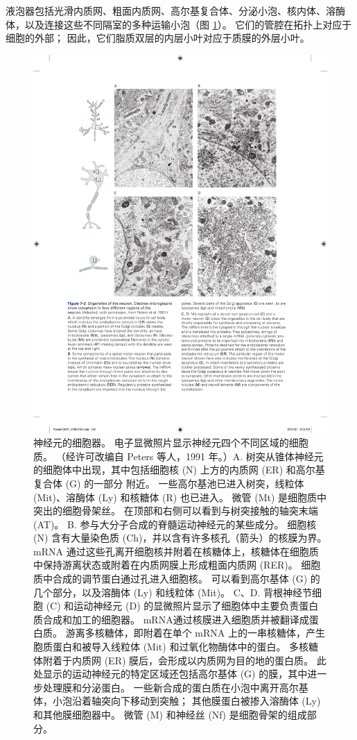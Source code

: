 液泡器包括光滑内质网、粗面内质网、高尔基复合体、分泌小泡、核内体、溶酶体，以及连接这些不同隔室的多种运输小泡（图 \ref{fig:7_3}）。 
它们的管腔在拓扑上对应于细胞的外部； 
因此，它们脂质双层的内层小叶对应于质膜的外层小叶。

\begin{figure}[htbp]
	\centering
	\includegraphics[width=1.0\linewidth]{chap07/fig_7_3}
	\caption{神经元的细胞器。 电子显微照片显示神经元四个不同区域的细胞质。 （经许可改编自 Peters 等人，1991 年。）A. 树突从锥体神经元的细胞体中出现，其中包括细胞核 (N) 上方的内质网 (ER) 和高尔基复合体 (G) 的一部分 附近。 一些高尔基池已进入树突，线粒体 (Mit)、溶酶体 (Ly) 和核糖体 (R) 也已进入。 微管 (Mt) 是细胞质中突出的细胞骨架丝。 在顶部和右侧可以看到与树突接触的轴突末端 (AT)。 B. 参与大分子合成的脊髓运动神经元的某些成分。 细胞核 (N) 含有大量染色质 (Ch)，并以含有许多核孔（箭头）的核膜为界。 mRNA 通过这些孔离开细胞核并附着在核糖体上，核糖体在细胞质中保持游离状态或附着在内质网膜上形成粗面内质网 (RER)。 细胞质中合成的调节蛋白通过孔进入细胞核。 可以看到高尔基体 (G) 的几个部分，以及溶酶体 (Ly) 和线粒体 (Mit)。 C、D. 背根神经节细胞 (C) 和运动神经元 (D) 的显微照片显示了细胞体中主要负责蛋白质合成和加工的细胞器。 mRNA通过核膜进入细胞质并被翻译成蛋白质。 游离多核糖体，即附着在单个 mRNA 上的一串核糖体，产生胞质蛋白和被导入线粒体 (Mit) 和过氧化物酶体中的蛋白。 多核糖体附着于内质网 (ER) 膜后，会形成以内质网为目的地的蛋白质。 此处显示的运动神经元的特定区域还包括高尔基体 (G) 的膜，其中进一步处理膜和分泌蛋白。 一些新合成的蛋白质在小泡中离开高尔基体，小泡沿着轴突向下移动到突触； 其他膜蛋白被掺入溶酶体 (Ly) 和其他膜细胞器中。 微管 (M) 和神经丝 (Nf) 是细胞骨架的组成部分。}
	\label{fig:7_3}
\end{figure}


